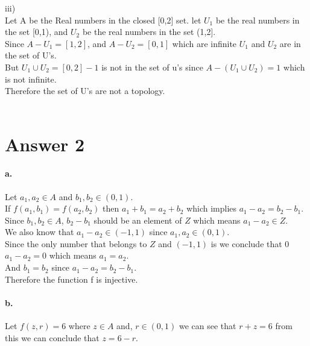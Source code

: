 \documentclass[11pt]{article}
\begin{document}
iii)\\

Let A be the Real numbers in the closed [0,2] set. let $U_1$ be the real numbers in the set [0,1), and $U_2$ be the real numbers in the set (1,2].\\

Since $A-U_1 = [1,2]$, and $A-U_2 = [0,1]$ which are infinite $U_1$ and $U_2$ are in the set of U's.\\

But $U_1 \cup U_2 = [0,2] - {1}$ is not in the set of u's since $A - (U_1 \cup U_2) = {1}$ which is not infinite.\\

Therefore the set of U's are not a topology.\\\\

\section*{Answer 2}
\paragraph{a.}
Let $a_1, a_2 \in A$ and $b_1, b_2 \in (0,1)$.\\

If $f(a_1, b_1) = f(a_2, b_2)$ then $a_1 + b_1 = a_2 + b_2$ which implies $a_1 - a_2 = b_2 - b_1$.\\

Since $b_1, b_2 \in A$, $b_2 - b_1$ should be an element of $Z$ which means $a_1 - a_2 \in Z$.\\

We also know that $a_1 - a_2 \in (-1,1)$ since $a_1, a_2 \in (0,1)$.\\

Since the only number that belongs to $Z$ and $(-1,1)$ is we conclude that 0 $a_1 - a_2 = 0$ which means $a_1 = a_2$.\\

And $b_1 = b_2$ since $a_1 - a_2 = b_2 - b_1$.\\

Therefore the function f is injective.\\

\paragraph{b.}
Let $f(z,r) = 6$ where $z \in A$ and, $r \in (0,1)$ we can see that $r+z = 6$ from this we can conclude that $z = 6-r$.\\
\end{document}
